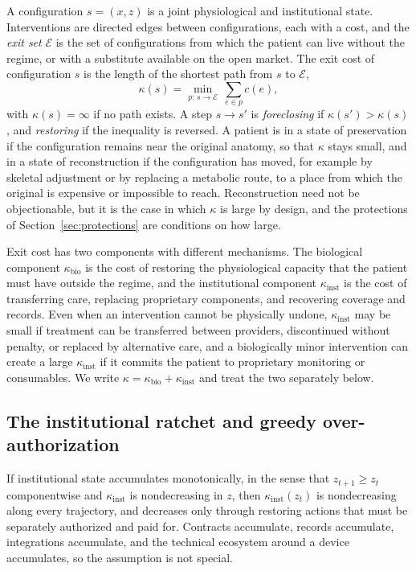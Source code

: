\documentclass[11pt]{article}
\theoremstyle{plain}
\theoremstyle{definition}
\theoremstyle{remark}
\begin{document}
A configuration $s=(x,z)$ is a joint physiological and institutional state. Interventions are directed edges between configurations, each with a cost, and the \emph{exit set} $\mathcal E$ is the set of configurations from which the patient can live without the regime, or with a substitute available on the open market. The exit cost of configuration $s$ is the length of the shortest path from $s$ to $\mathcal E$,
\begin{equation}\label{eq:exitcost}
\kappa(s)=\min_{p:\,s\to\mathcal E}\ \sum_{e\in p}c(e),
\end{equation}
with $\kappa(s)=\infty$ if no path exists. A step $s\to s'$ is \emph{foreclosing} if $\kappa(s')>\kappa(s)$, and \emph{restoring} if the inequality is reversed. A patient is in a state of preservation if the configuration remains near the original anatomy, so that $\kappa$ stays small, and in a state of reconstruction if the configuration has moved, for example by skeletal adjustment or by replacing a metabolic route, to a place from which the original is expensive or impossible to reach. Reconstruction need not be objectionable, but it is the case in which $\kappa$ is large by design, and the protections of Section~\ref{sec:protections} are conditions on how large.

Exit cost has two components with different mechanisms. The biological component $\kappa_{\mathrm{bio}}$ is the cost of restoring the physiological capacity that the patient must have outside the regime, and the institutional component $\kappa_{\mathrm{inst}}$ is the cost of transferring care, replacing proprietary components, and recovering coverage and records. Even when an intervention cannot be physically undone, $\kappa_{\mathrm{inst}}$ may be small if treatment can be transferred between providers, discontinued without penalty, or replaced by alternative care, and a biologically minor intervention can create a large $\kappa_{\mathrm{inst}}$ if it commits the patient to proprietary monitoring or consumables. We write $\kappa=\kappa_{\mathrm{bio}}+\kappa_{\mathrm{inst}}$ and treat the two separately below.

\subsection{The institutional ratchet and greedy over-authorization}

If institutional state accumulates monotonically, in the sense that $z_{t+1}\ge z_t$ componentwise and $\kappa_{\mathrm{inst}}$ is nondecreasing in $z$, then $\kappa_{\mathrm{inst}}(z_t)$ is nondecreasing along every trajectory, and decreases only through restoring actions that must be separately authorized and paid for. Contracts accumulate, records accumulate, integrations accumulate, and the technical ecosystem around a device accumulates, so the assumption is not special.
\end{document}

